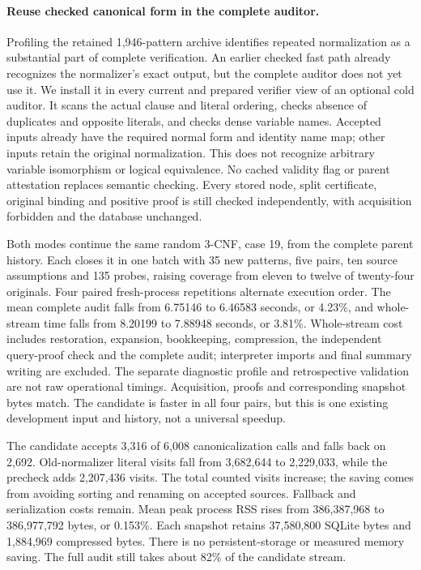 \documentclass[11pt,a4paper]{article}
\numberwithin{equation}{section}
\theoremstyle{plain}
\theoremstyle{definition}
\theoremstyle{remark}
\begin{document}
\paragraph{Reuse checked canonical form in the complete auditor.}
Profiling the retained 1,946-pattern archive identifies repeated normalization
as a substantial part of complete verification. An earlier checked fast path
already recognizes the normalizer's exact output, but the complete auditor does
not yet use it. We install it in every current and prepared verifier view of an
optional cold auditor. It scans the actual clause and literal ordering, checks
absence of duplicates and opposite literals, and checks dense variable names.
Accepted inputs already have the required normal form and identity name map;
other inputs retain the original normalization. This does not recognize arbitrary
variable isomorphism or logical equivalence. No cached validity flag or parent
attestation replaces semantic checking. Every stored node, split certificate,
original binding and positive proof is still checked independently, with
acquisition forbidden and the database unchanged.

Both modes continue the same random 3-CNF, case 19, from the complete parent
history. Each closes it in one batch with 35 new patterns, five pairs, ten source
assumptions and 135 probes, raising coverage from eleven to twelve of twenty-four
originals. Four paired fresh-process repetitions alternate execution order.
The mean complete audit falls from 6.75146 to 6.46583 seconds, or 4.23\%, and
whole-stream time falls from 8.20199 to 7.88948 seconds, or 3.81\%. Whole-stream
cost includes restoration, expansion, bookkeeping, compression, the independent
query-proof check and the complete audit; interpreter imports and final summary
writing are excluded. The separate diagnostic profile and retrospective
validation are not raw operational timings. Acquisition, proofs and corresponding
snapshot bytes match. The candidate is faster in all four pairs, but this is
one existing development input and history, not a universal speedup.

The candidate accepts 3,316 of 6,008 canonicalization calls and falls back on
2,692. Old-normalizer literal visits fall from 3,682,644 to 2,229,033, while the
precheck adds 2,207,436 visits. The total counted visits increase; the saving
comes from avoiding sorting and renaming on accepted sources. Fallback and
serialization costs remain. Mean peak process RSS rises from 386,387,968 to
386,977,792 bytes, or 0.153\%. Each snapshot retains 37,580,800 SQLite bytes and
1,884,969 compressed bytes. There is no persistent-storage or measured memory
saving. The full audit still takes about 82\% of the candidate stream.
\end{document}

